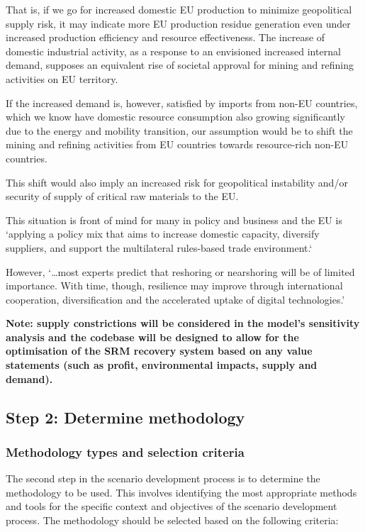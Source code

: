 That is, if we go for increased domestic EU production to minimize geopolitical supply risk, it may indicate more EU production residue generation even under increased production efficiency and resource effectiveness. The increase of domestic industrial activity, as a response to an envisioned increased internal demand, supposes an equivalent rise of societal approval for mining and refining activities on EU territory.

If the increased demand is, however, satisfied by imports from non-EU countries, which we know have domestic resource consumption also growing significantly due to the energy and mobility transition, our assumption would be to shift the mining and refining activities from EU countries towards resource-rich non-EU countries.


This shift would also imply an increased risk for geopolitical instability and/or security of supply of critical raw materials to the EU.

This situation is front of mind for many in policy and business and the EU is `applying a policy mix that aims to increase domestic capacity, diversify suppliers, and support the multilateral rules-based trade environment.`

However, `\ldots most experts predict that reshoring or nearshoring will be of limited importance. With time, though, resilience may improve through international cooperation, diversification and the accelerated uptake of digital technologies.'~\cite{szczepanski2021resilience}

\textbf{Note: supply constrictions will be considered in the model's sensitivity analysis and the codebase will be designed to allow for the optimisation of the SRM recovery system based on any value statements (such as profit, environmental impacts, supply and demand).}



\subsection{Step 2: Determine methodology}

\subsubsection{Methodology types and selection criteria}
The second step in the scenario development process is to determine the methodology to be used. This involves identifying the most appropriate methods and tools for the specific context and objectives of the scenario development process. The methodology should be selected based on the following criteria:


